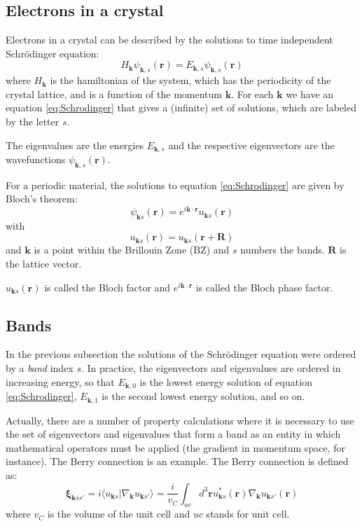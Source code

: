 \documentclass[a4paper,12pt]{report}
\begin{document}
\subsection*{Electrons in a crystal}

Electrons in a crystal can be described by the solutions to time independent Schr\"odinger equation:
\begin{equation}\label{eq:Schrodinger}
 H_{\pmb{k}}\psi_{\pmb{k},s}(\pmb{r}) = E_{\pmb{k},s}\psi_{\pmb{k},s}(\pmb{r})
\end{equation}
where $H_{\pmb{k}}$ is the hamiltonian of the system, which has the periodicity of the crystal lattice,
and is a function of the momentum $\pmb{k}$.
For each $\pmb{k}$ we have an equation \ref{eq:Schrodinger} that gives a (infinite) set of solutions,
which are labeled by the letter $s$.

The eigenvalues are the energies $E_{\pmb{k},s}$ and the respective eigenvectors are the wavefunctions
$\psi_{\pmb{k},s}(\pmb{r})$.

For a periodic material, the solutions to equation \ref{eq:Schrodinger} are given by Bloch's theorem:
\begin{equation}
 \psi_{\pmb{k}s}(\pmb{r}) = e^{i\pmb{k}\cdot\pmb{r}}u_{\pmb{k}s}(\pmb{r})
\end{equation}
with
\begin{equation}
 u_{\pmb{k}s}(\pmb{r}) = u_{\pmb{k}s}(\pmb{r} + \pmb{R})
\end{equation}
and $\pmb{k}$ is a point within the Brillouin Zone (BZ) and $s$ numbers the bands.
$\pmb{R}$ is the lattice vector.

$u_{\pmb{k}s}(\pmb{r})$ is called the Bloch factor and $e^{i\pmb{k}\cdot\pmb{r}}$
is called the Bloch phase factor.


\subsection*{Bands}

In the previous subsection the solutions of the Schr\"odinger equation were ordered by a \emph{band} index $s$.
In practice, the eigenvectors and eigenvalues are ordered in increasing energy, so that $E_{\pmb{k},0}$ is
the lowest energy solution of equation \ref{eq:Schrodinger}, $E_{\pmb{k},1}$ is the second lowest energy solution,
and so on.

Actually, there are a number of property calculations where it is necessary to use the set of eigenvectors
and eigenvalues that form a band as an entity in which mathematical operators must be applied
(the gradient in momentum space, for instance).
The Berry connection is an example.
The Berry connection is defined as:
\begin{equation}\label{eq:berry}
 \pmb{\xi}_{\pmb{k}ss'} = i\langle u_{\pmb{k}s}|\nabla_{\pmb{k}} u_{\pmb{k}s'} \rangle
                          = \dfrac{i}{v_C}\int_{uc} d^3\pmb{r}u_{\pmb{k}s}^*(\pmb{r})
                          \nabla_{\pmb{k}} u_{\pmb{k}s'}(\pmb{r})
\end{equation}
where $v_C$ is the volume of the unit cell and $uc$ stands for unit cell.
\end{document}
